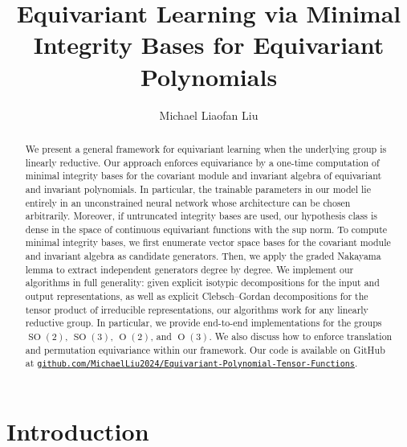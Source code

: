 \documentclass[11pt]{article}
\title{Equivariant Learning via Minimal Integrity Bases for Equivariant Polynomials}
\author{Michael Liaofan Liu}
\date{}
\newcommand{\SO}{\operatorname{SO}}
\newcommand{\Orth}{\operatorname{O}}
\theoremstyle{definition}
\begin{document}
\maketitle

\begin{abstract}

  We present a general framework for equivariant learning when the underlying group is linearly reductive.
  Our approach enforces equivariance by a one-time computation of minimal integrity bases for the covariant module and invariant algebra of equivariant and invariant polynomials.
  In particular, the trainable parameters in our model lie entirely in an unconstrained neural network whose architecture can be chosen arbitrarily.
  Moreover, if untruncated integrity bases are used, our hypothesis class is dense in the space of continuous equivariant functions with the sup norm.
  To compute minimal integrity bases, we first enumerate vector space bases for the covariant module and invariant algebra as candidate generators.
  Then, we apply the graded Nakayama lemma to extract independent generators degree by degree.
  We implement our algorithms in full generality: given explicit isotypic decompositions for the input and output representations, as well as explicit Clebsch--Gordan decompositions for the tensor product of irreducible representations, our algorithms work for any linearly reductive group.
  In particular, we provide end-to-end implementations for the groups $\SO(2)$, $\SO(3)$, $\Orth(2)$, and $\Orth(3)$. We also discuss how to enforce translation and permutation equivariance within our framework.
  Our code is available on GitHub at \href{https://github.com/MichaelLiu2024/Equivariant-Polynomial-Tensor-Functions}{\texttt{github.com/MichaelLiu2024/Equivariant-Polynomial-Tensor-Functions}}.

\end{abstract}

\section{Introduction}

\end{document}

